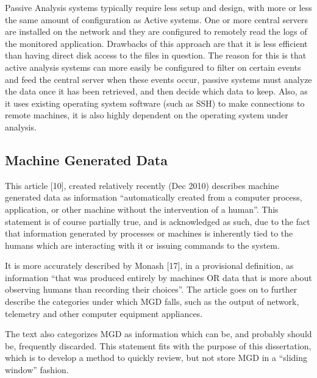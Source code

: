 \documentclass{llncs}
\begin{document}
Passive Analysis systems typically require less setup and design, with more or less the same amount of configuration as Active systems. One or more central servers are installed on the network and they are configured to remotely read the logs of the monitored application. Drawbacks of this approach are that it is less efficient than having direct disk access to the files in question. The reason for this is that active analysis systems can more easily be configured to filter on certain events and feed the central server when these events occur, passive systems must analyze the data once it has been retrieved, and then decide which data to keep. Also, as it uses existing operating system software (such as SSH) to make connections to remote machines, it is also highly dependent on the operating system under analysis.

%
\subsection{Machine Generated Data}
This article [10], created relatively recently (Dec 2010) describes machine generated data as information “automatically created from a computer process, application, or other machine without the intervention of a human”. This statement is of course partially true, and is acknowledged as such, due to the fact that information generated by processes or machines is inherently tied to the humans which are interacting with it or issuing commands to the system.

It is more accurately described by Monash [17], in a provisional definition, as information “that was produced entirely by machines OR data that is more about observing humans than recording their choices”. The article goes on to further describe the categories under which MGD falls, such as the output of network, telemetry and other computer equipment appliances.

The text also categorizes MGD as information which can be, and probably should be, frequently discarded. This statement fits with the purpose of this dissertation, which is to develop a method to quickly review, but not store MGD in a “sliding window” fashion.
%
\end{document}
